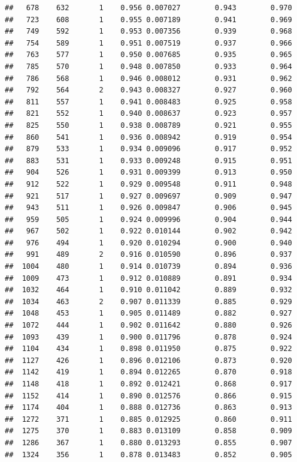 \documentclass[]{article}
\numberwithin{figure}{section}
\numberwithin{table}{section}
\theoremstyle{definition}
\theoremstyle{definition}
\theoremstyle{definition}
\theoremstyle{remark}
\begin{document}
\begin{verbatim}
##   678    632       1    0.956 0.007027        0.943        0.970
##   723    608       1    0.955 0.007189        0.941        0.969
##   749    592       1    0.953 0.007356        0.939        0.968
##   754    589       1    0.951 0.007519        0.937        0.966
##   763    577       1    0.950 0.007685        0.935        0.965
##   785    570       1    0.948 0.007850        0.933        0.964
##   786    568       1    0.946 0.008012        0.931        0.962
##   792    564       2    0.943 0.008327        0.927        0.960
##   811    557       1    0.941 0.008483        0.925        0.958
##   821    552       1    0.940 0.008637        0.923        0.957
##   825    550       1    0.938 0.008789        0.921        0.955
##   860    541       1    0.936 0.008942        0.919        0.954
##   879    533       1    0.934 0.009096        0.917        0.952
##   883    531       1    0.933 0.009248        0.915        0.951
##   904    526       1    0.931 0.009399        0.913        0.950
##   912    522       1    0.929 0.009548        0.911        0.948
##   921    517       1    0.927 0.009697        0.909        0.947
##   943    511       1    0.926 0.009847        0.906        0.945
##   959    505       1    0.924 0.009996        0.904        0.944
##   967    502       1    0.922 0.010144        0.902        0.942
##   976    494       1    0.920 0.010294        0.900        0.940
##   991    489       2    0.916 0.010590        0.896        0.937
##  1004    480       1    0.914 0.010739        0.894        0.936
##  1009    473       1    0.912 0.010889        0.891        0.934
##  1032    464       1    0.910 0.011042        0.889        0.932
##  1034    463       2    0.907 0.011339        0.885        0.929
##  1048    453       1    0.905 0.011489        0.882        0.927
##  1072    444       1    0.902 0.011642        0.880        0.926
##  1093    439       1    0.900 0.011796        0.878        0.924
##  1104    434       1    0.898 0.011950        0.875        0.922
##  1127    426       1    0.896 0.012106        0.873        0.920
##  1142    419       1    0.894 0.012265        0.870        0.918
##  1148    418       1    0.892 0.012421        0.868        0.917
##  1152    414       1    0.890 0.012576        0.866        0.915
##  1174    404       1    0.888 0.012736        0.863        0.913
##  1272    371       1    0.885 0.012925        0.860        0.911
##  1275    370       1    0.883 0.013109        0.858        0.909
##  1286    367       1    0.880 0.013293        0.855        0.907
##  1324    356       1    0.878 0.013483        0.852        0.905

\end{verbatim}
\end{document}
